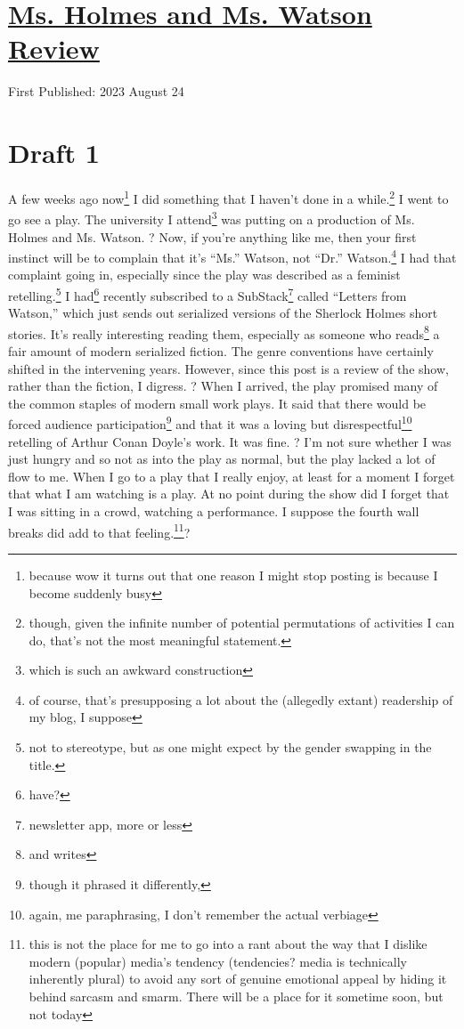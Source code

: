 \documentclass[12pt]{article}[titlepage]
\newcommand{\say}[1]{``#1''}
\newcommand{\1}{\={a}}
\newcommand{\2}{\={e}}
\newcommand{\3}{\={\i}}
\newcommand{\4}{\=o}
\newcommand{\5}{\=u}
\newcommand{\6}{\={A}}
\renewcommand{\,}{\textsuperscript{,}}
\begin{document}
\doublespacing
\section{\href{ms-holmes-ms-watson.html}{Ms. Holmes and Ms. Watson Review}}
First Published: 2023 August 24
\section{Draft 1}
A few weeks ago now\footnote{because wow it turns out that one reason I might stop posting is because I become suddenly busy} I did something that I haven't done in a while.\footnote{though, given the infinite number of potential permutations of activities I can do, that's not the most meaningful statement.}
I went to go see a play.
The university I attend\footnote{which is such an awkward construction} was putting on a production of Ms. Holmes and Ms. Watson.
?
Now, if you're anything like me, then your first instinct will be to complain that it's \say{Ms.} Watson, not \say{Dr.} Watson.\footnote{of course, that's presupposing a lot about the (allegedly extant) readership of my blog, I suppose}
I had that complaint going in, especially since the play was described as a feminist retelling.\footnote{not to stereotype, but as one might expect by the gender swapping in the title.}
I had\footnote{have?} recently subscribed to a SubStack\footnote{newsletter app, more or less} called \say{Letters from Watson,} which just sends out serialized versions of the Sherlock Holmes short stories.
It's really interesting reading them, especially as someone who reads\footnote{and writes} a fair amount of modern serialized fiction.
The genre conventions have certainly shifted in the intervening years.
However, since this post is a review of the show, rather than the fiction, I digress.
?
When I arrived, the play promised many of the common staples of modern small work plays.
It said that there would be forced audience participation\footnote{though it phrased it differently,} and that it was a loving but disrespectful\footnote{again, me paraphrasing, I don't remember the actual verbiage} retelling of Arthur Conan Doyle's work.
It was fine.
?
I'm not sure whether I was just hungry and so not as into the play as normal, but the play lacked a lot of flow to me.
When I go to a play that I really enjoy, at least for a moment I forget that what I am watching is a play.
At no point during the show did I forget that I was sitting in a crowd, watching a performance.
I suppose the fourth wall breaks did add to that feeling.\footnote{this is not the place for me to go into a rant about the way that I dislike modern (popular) media's tendency (tendencies? media is technically inherently plural) to avoid any sort of genuine emotional appeal by hiding it behind sarcasm and smarm.
There will be a place for it sometime soon, but not today}?
\end{document}
